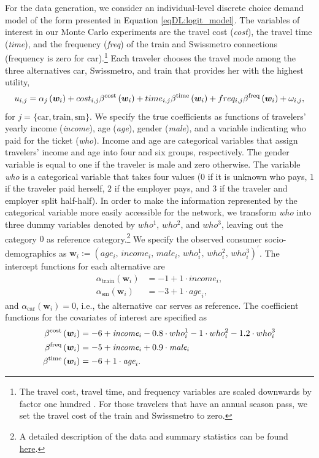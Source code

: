 \documentclass[a4paper, 12pt]{article}
\begin{document}
For the data generation, we consider an individual-level discrete choice demand model of the form presented in Equation \ref{eqDL:logit_model}. 
The variables of interest in our Monte Carlo experiments are the travel cost (\textit{cost}), the travel time (\textit{time}), and the frequency (\textit{freq}) of the train and Swissmetro connections (frequency is zero for car).\footnote{The travel cost, travel time, and frequency variables are scaled downwards by factor one hundred \cite{sifringer2020}. For those travelers that have an annual season pass, we set the travel cost of the train and Swissmetro to zero.}
Each traveler chooses the travel mode among the three alternatives car, Swissmetro, and train that provides her with the highest utility,
\begin{equation}
u_{i,j}=\alpha_j\left(\bm{w}_i\right) + cost_{i,j}\beta^{\text{cost}}\left(\bm{w}_i\right) + time_{i,j}\beta^{\text{time}}\left(\bm{w}_i\right) + freq_{i,j}\beta^{\text{freq}}\left(\bm{w}_i\right) + \omega_{i,j},\notag
\end{equation}
for $j=\{\text{car}, \text{train}, \text{sm}\}$.  
We specify the true coefficients  as functions of travelers' yearly income (\textit{income}), age (\textit{age}), gender (\textit{male}), and a variable indicating who paid for the ticket (\textit{who}). Income and age are categorical variables that assign travelers' income and age into four and six groups, respectively. The gender variable is equal to one if the traveler is male and zero otherwise.
The variable \textit{who} is a categorical variable that takes four values ($0$ if it is unknown who pays, $1$ if the traveler paid herself, $2$ if the employer pays, and $3$ if the traveler and employer split half-half). In order to make the information represented by the categorical variable more easily accessible for the network, we transform  \textit{who}  into three dummy variables denoted by $who^1$, $who^2$, and $who^3$, leaving out the category $0$ as reference category.\footnote{A detailed description of the data and summary statistics can be found \href{https://transp-or.epfl.ch/documents/technicalReports/CS_SwissmetroDescription.pdf}{here}.}
We specify the observed consumer socio-demographics as $\bm{w}_i := (age_i,\, income_i,\,male_i,\, who^1_i,\, who^2_i,\, who^3_i)^{\prime}$.
The intercept functions for each alternative are 
\begin{align*}
\alpha_{\text{train}}\left(\bm{w}_i\right)&=-1 + 1\cdot\textit{income}_i,\\
 \alpha_{\text{sm}}\left(\bm{w}_i\right)&=-3 + 1\cdot\textit{age}_i,
\end{align*}
and $\alpha_{\text{car}}\left(\bm{w}_i\right) = 0$, i.e., the alternative car serves as reference. The coefficient functions for the covariates of interest are specified as
\begin{align}
\beta^{\text{cost}}\left(\bm{w}_i\right)&=-6 + \textit{income}_i - 0.8 \cdot who^1_i- 1 \cdot who^2_i  - 1.2 \cdot who^3_i \\
\beta^\text{freq}\left(\bm{w}_i\right)&=-5  + \textit{income}_i + 0.9\cdot\textit{male}_i \notag\\ 
 \beta^{\text{time}}\left(\bm{w}_i\right)&=-6 + 1\cdot \textit{age}_i.\notag
\end{align}
\end{document}
